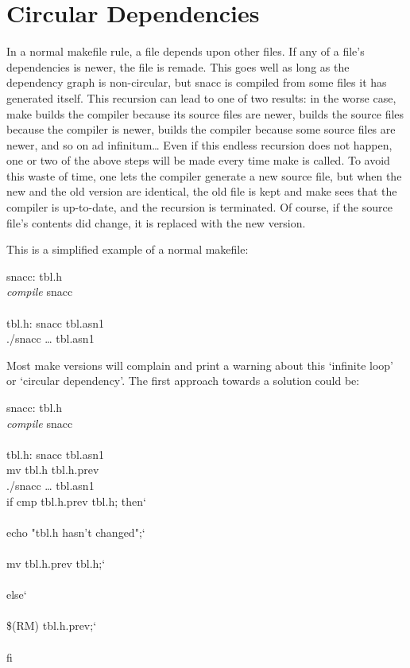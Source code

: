 \section{Circular Dependencies}

In a normal makefile rule, a file depends upon other files.
If any of a file's dependencies is newer, the file is remade.
This goes well as long as the dependency graph is non-circular, but snacc is compiled from some files it has generated itself.
This recursion can lead to one of two results: in the worse case, {\ufn make} builds the compiler because its source files are newer, builds the source files because the compiler is newer, builds the compiler because some source files are newer, and so on ad infinitum\dots{}
Even if this endless recursion does not happen, one or two of the above steps will be made every time {\ufn make} is called.
To avoid this waste of time, one lets the compiler generate a new source file, but when the new and the old version are identical, the old file is kept and {\ufn make} sees that the compiler is up-to-date, and the recursion is terminated.
Of course, if the source file's contents did change, it is replaced with the new version.

This is a simplified example of a normal makefile:

\begin{Makefile}
snacc:		\>tbl.h\\
		\>\emph{compile} snacc\\
\\
tbl.h:		\>snacc tbl.asn1\\
		\>./snacc \dots{} tbl.asn1\\
\end{Makefile}

Most {\ufn make} versions will complain and print a warning about this `infinite loop' or `circular dependency'.
The first approach towards a solution could be:

\begin{Makefile}
snacc:		\>tbl.h\\
		\>\emph{compile} snacc\\
\\
tbl.h:		\>snacc tbl.asn1\\
		\>mv tbl.h tbl.h.prev\\
		\>./snacc \dots{} tbl.asn1\\
		\>if cmp tbl.h.prev tbl.h; then\char`\\\\
		\>\>  echo "tbl.h hasn't changed";\char`\\\\
		\>\>  mv tbl.h.prev tbl.h;\char`\\\\
		\>else\char`\\\\
		\>\>  \$(RM) tbl.h.prev;\char`\\\\
		\>fi\\
\end{Makefile}


